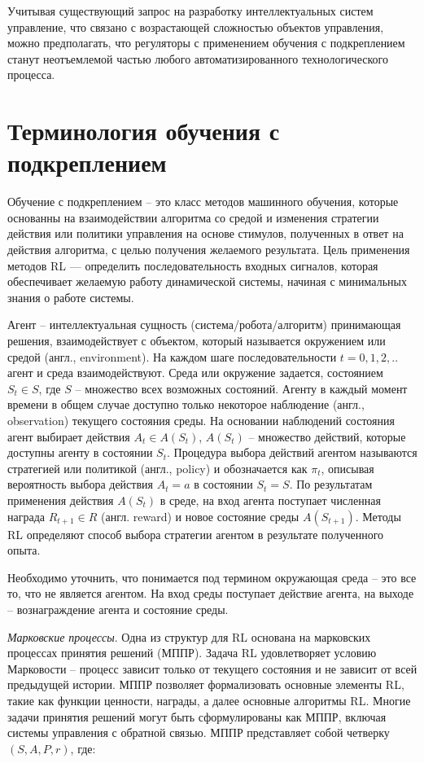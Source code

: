 Учитывая существующий запрос  на разработку интеллектуальных систем управление, что связано с возрастающей сложностью объектов управления, можно предполагать, что регуляторы с применением обучения с подкреплением станут неотъемлемой частью любого автоматизированного технологического процесса.
%


\section{Терминология обучения с подкреплением} \label{ch1:sec2} %

Обучение с подкреплением -- это класс методов машинного обучения, которые основанны на взаимодействии алгоритма со средой и изменения стратегии действия или политики управления на основе стимулов, полученных в ответ на действия алгоритма, с целью получения желаемого результата. Цель применения методов RL — определить последовательность входных сигналов, которая обеспечивает желаемую работу динамической системы, начиная с минимальных знания о работе системы.

Агент -- интеллектуальная сущность (система/робота/алгоритм) принимающая решения, взаимодействует с объектом, который называется окружением или средой (англ., environment).  На каждом шаге последовательности $t = 0, 1, 2, ..$ агент и среда взаимодействуют. Среда или окружение задается, состоянием $S_t \in S$, где $S$ -- множество всех возможных состояний. Агенту в каждый момент времени в общем случае доступно только некоторое наблюдение (англ., observation) текущего состояния среды. На основании наблюдений состояния агент выбирает действия $A_t \in A(S_t)$, $A(S_t)$ -- множество действий, которые доступны агенту в состоянии $S_t$. Процедура выбора действий агентом называются стратегией или политикой (англ., policy) и обозначается как $\pi_t$, описывая вероятность выбора действия $A_t = a$ в состоянии $S_t = S$. По результатам применения действия $A(S_t)$ в среде, на вход агента поступает численная награда $R_{t+1} \in R$ (англ. reward) и новое состояние среды $A(S_{t+1})$. Методы RL определяют способ выбора стратегии агентом в результате полученного опыта.

Необходимо уточнить, что понимается под термином окружающая среда -- это все то, что не является агентом. На вход среды поступает действие агента, на выходе -- вознаграждение агента и состояние среды. 

\textit{Марковские процессы}. Одна из структур для RL основана на марковских процессах принятия решений (МППР). Задача RL удовлетворяет условию Марковости -- процесс зависит только от текущего состояния и не зависит от всей предыдущей истории. МППР позволяет формализовать основные элементы RL, такие как функции ценности, награды, а далее основные алгоритмы RL. Многие задачи принятия решений могут быть сформулированы как МППР, включая системы управления с обратной связью.
МППР представляет собой четверку $(S, A, P, r)$, где:


